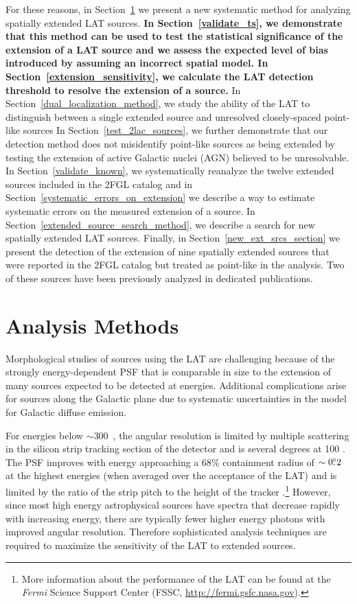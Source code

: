 \documentclass[12pt,preprint]{aastex}
\newcommand{\mev}{\text{MeV}\xspace}
\newcommand{\gev}{\text{GeV}\xspace}
\newcommand{\fermi}{\textit{Fermi}\xspace}
\newcommand{\newtext}[1]{{\bfseries \color{red}#1}}
\begin{document}
 For these reasons, in Section~\ref{analysis_methods_section}
we present a new systematic method for analyzing spatially extended
LAT sources.  
\newtext{
In Section~\ref{validate_ts}, we demonstrate
that this method can be used to test the statistical significance of the
extension of a LAT source and we assess the expected level of bias 
introduced by assuming an incorrect spatial model.
In Section~\ref{extension_sensitivity},
we calculate the LAT detection threshold to resolve the extension
of a source.}
In Section~\ref{dual_localization_method}, we
study the ability of the LAT to 
distinguish between a single extended source and unresolved closely-spaced point-like sources
In Section~\ref{test_2lac_sources}, we further demonstrate that our
detection method does not misidentify point-like sources as being
extended by testing the extension of active Galactic nuclei (AGN)
believed to be unresolvable.  In Section~\ref{validate_known},
we systematically reanalyze the twelve extended sources included
in the 2FGL catalog and in Section~\ref{systematic_errors_on_extension}
we describe a way to estimate systematic errors on the measured extension of a source.
In Section~\ref{extended_source_search_method}, we
describe a search for new spatially extended LAT sources. Finally,
in Section~\ref{new_ext_srcs_section} we present the detection of the
extension of nine spatially extended sources that were reported in the 2FGL catalog
but treated as point-like in the analysis.  Two of these sources have been previously analyzed in
dedicated publications.


\section{Analysis Methods}
\label{analysis_methods_section}

Morphological studies of sources using the LAT are challenging
because of the strongly energy-dependent PSF that is comparable in
size to the extension of many sources expected to be detected at
\gev energies.  Additional complications arise for sources along
the Galactic plane due to systematic uncertainties in the model for
Galactic diffuse emission.  

For energies below $\sim$300~\mev, the angular resolution is limited by
multiple scattering in the silicon strip tracking section
of the detector and is several degrees at 100 \mev.  The PSF improves
with energy approaching a 68\% containment radius of $\sim0\mbox{$.\!\!^\circ$}2$ at
the highest energies (when averaged over the acceptance of the LAT)
and is limited by the ratio of the strip pitch to the height of the tracker
\citep{atwood_LAT_mission,on_orbit_calibration,lat_on_orbit_psf}.\footnote{More
information about the performance of the LAT can be found at the \fermi
Science Support Center (FSSC, \url{http://fermi.gsfc.nasa.gov}).} However,
since most high energy astrophysical sources have spectra that decrease
rapidly with increasing energy, there are typically fewer higher
energy photons with improved angular resolution. Therefore sophisticated
analysis techniques are required to maximize the sensitivity of the LAT
to extended sources.
\end{document}
